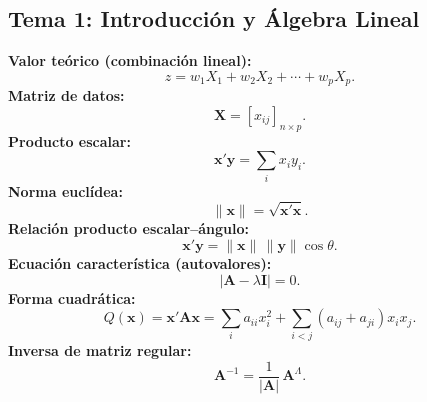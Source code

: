 \documentclass[12pt, a4paper]{article}
\theoremstyle{plain}
\theoremstyle{definition}
\theoremstyle{remark}
\newcommand{\mat}[1]{\mathbf{#1}}
\begin{document}
\subsection*{Tema 1: Introducción y Álgebra Lineal}
\begin{mdframed}[style=resultado]
\textbf{Valor teórico (combinación lineal):}
\[
  z = w_1X_1 + w_2X_2 + \cdots + w_pX_p.
\]
\textbf{Matriz de datos:}
\[
  \mat{X}=[x_{ij}]_{n\times p}.
\]
\textbf{Producto escalar:}
\[
  \mathbf{x}'\mathbf{y}=\sum_i x_i y_i.
\]
\textbf{Norma euclídea:}
\[
  \|\mathbf{x}\|=\sqrt{\mathbf{x}'\mathbf{x}}.
\]
\textbf{Relación producto escalar--ángulo:}
\[
  \mathbf{x}'\mathbf{y}=\|\mathbf{x}\|\,\|\mathbf{y}\|\cos\theta.
\]
\textbf{Ecuación característica (autovalores):}
\[
  |\mat{A}-\lambda\mat{I}|=0.
\]
\textbf{Forma cuadrática:}
\[
  Q(\mathbf{x})=\mathbf{x}'\mat{A}\mathbf{x}
  =\sum_i a_{ii}x_i^2+\sum_{i<j}(a_{ij}+a_{ji})x_ix_j.
\]
\textbf{Inversa de matriz regular:}
\[
  \mat{A}^{-1}=\frac{1}{|\mat{A}|}\,\mat{A}^{\Lambda}.
\]
\end{mdframed}
\end{document}
